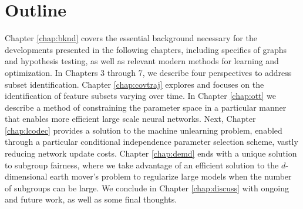 
\section{Outline}
Chapter \ref{chap:bknd} covers the essential background necessary for the developments presented in the following chapters, including specifics of graphs and hypothesis testing, as well as relevant modern methods for learning and optimization.
In Chapters 3 through 7, we describe four perspectives to address subset identification.
Chapter \ref{chap:covtraj} explores and focuses on the identification of feature subsets varying over time.
In Chapter \ref{chap:ott} we describe a method of constraining the parameter space in a particular manner
that enables more efficient large scale neural networks.
Next, Chapter \ref{chap:lcodec} provides a solution to the machine unlearning problem,
enabled through a particular conditional independence parameter selection scheme, vastly reducing network update costs.
Chapter \ref{chap:demd} ends with a unique solution to subgroup fairness, 
where we take advantage of an efficient solution to
the $d$-dimensional earth mover's problem
to regularize large models when the number of subgroups can be large.
We conclude in Chapter \ref{chap:discuss} with ongoing and future work, as well as some final thoughts.





